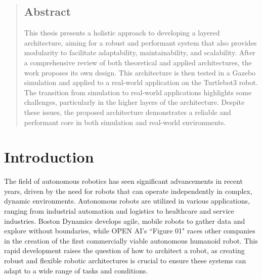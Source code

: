 \documentclass[%
paper=A4,               %
twoside=true,           %
openright,              %
11pt,                   %
bibliography=totoc,     %
titlepage=on,           %
DIV=12,                 %
BCOR=1.5cm,             %
parskip=half,            %
final
]{scrreprt}
\begin{document}
	\onehalfspacing
	\begin{titlepage}
		
	\end{titlepage}
	


	\tableofcontents
	\cleardoublepage

	\begin{abstract}
		\section*{Abstract}
	
	This thesis presents a holistic approach to developing a layered architecture, aiming for a robust and performant system that also provides modularity to facilitate adaptability, maintainability, and scalability. After a comprehensive review of both theoretical and applied architectures, the work proposes its own design. This architecture is then tested in a Gazebo simulation and applied to a real-world application on the Turtlebot3 robot. The transition from simulation to real-world applications highlights some challenges, particularly in the higher layers of the architecture. Despite these issues, the proposed architecture demonstrates a reliable and performant core in both simulation and real-world environments.
	
	
	\end{abstract}
	
	
	\chapter{Introduction}
	The field of autonomous robotics has seen significant advancements in recent years, driven by the need for robots that can operate independently in complex, dynamic environments. Autonomous robots are utilized in various applications, ranging from industrial automation and logistics to healthcare and service industries. Boston Dynamics develops agile, mobile robots to gather data and explore without boundaries, while OPEN AI's ``Figure 01" races other companies in the creation of the first commercially viable autonomous humanoid robot. This rapid development raises the question of how to architect a robot, as creating robust and flexible robotic architectures is crucial to ensure these systems can adapt to a wide range of tasks and conditions.
	
\end{document}
